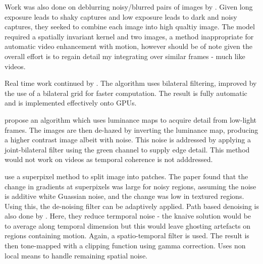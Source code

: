 \documentclass[12pt,a4paper]{article}
\begin{document}
	Work was also done on deblurring noisy/blurred pairs of images by \cite{Yuan:2007:IDB:1276377.1276379}. Given long exposure leads to shaky captures and low exposure leads to dark and noisy captures, they seeked to combine each image into high qualtiy image. The model required a spatially invariant kernel and two images, a method inappropriate for automatic video enhancement with motion, however should be of note given the overall effort is to regain detail my integrating over similar frames - much like videos.

	Real time work continued by \cite{Kovaleski2009}. The algorithm uses bilateral filtering, improved by the use of a bilateral grid for faster computation. The result is fully automatic and is implemented effectively onto GPUs.

	\cite{6460559} propose an algorithm which uses luminance maps to acquire detail from low-light frames. The images are then de-hazed by inverting the luminance map, producing a higher contrast image albeit with noise. This noise is addressed by applying a joint-bilateral filter using the green channel to supply edge detail. This method would not work on videos as temporal coherence is not adddressed.

	\cite{li2015low} use a superpixel method to split image into patches. The paper found that the change in gradients at superpixels was large for noisy regions, assuming the noise is additive white Guassian noise, and the change was low in textured regions. Using this, the de-noising filter can be adaptively applied. Path based denoising is also done by \cite{kim2015novel}. Here, they reduce termporal noise - the knaive solution would be to average along temporal dimension but this would leave ghosting artefacts on regions containing motion. Again, a spatio-temporal filter is used. The result is then tone-mapped with a clipping function using gamma correction. Uses non local means to handle remaining spatial noise.


\end{document}
